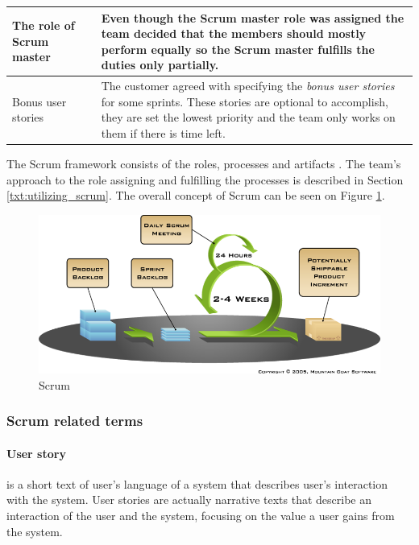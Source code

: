 \begin{table}[!h]
\begin{center}
\begin{tabularx}{0.9\textwidth}{ X c X }
		The role of Scrum master							& \cross 		& Even though the Scrum master role was assigned the team decided that the members should mostly perform equally so the Scrum master fulfills the duties only partially. \\
		\midrule
		Bonus user stories									& \plus			& The customer agreed with specifying the \textit{bonus user stories} for some sprints. These stories are optional to accomplish, they are set the lowest priority and the team only works on them if there is time left. \\
		\bottomrule[0.5mm]
		\end{tabularx}
	\end{center}
\end{table}

The Scrum framework consists of the roles, processes and artifacts \cite{viscardi2013professional}. The team's approach to the role assigning and fulfilling the processes is described in Section \ref{txt:utilizing_scrum}. The overall concept of Scrum can be seen on Figure \ref{fig:scrum}.

\begin{figure}[ht]
\centering
\includegraphics[width=\textwidth]{preliminaryStudies/scrum.png}
\caption{Scrum}
\label{fig:scrum}
\end{figure}

\subsubsection{Scrum related terms}

\paragraph{User story}
is a short text of user's language of a system that describes user's interaction with the system. User stories are actually narrative texts that describe an interaction of the user and the system, focusing on the value a user gains from the system.

